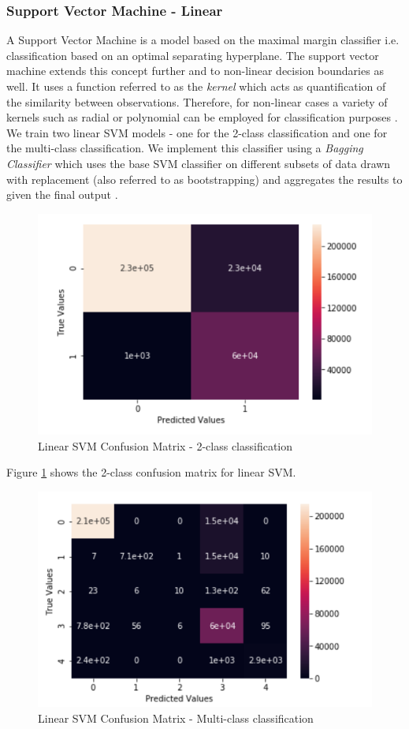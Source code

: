 \subsubsection{Support Vector Machine - Linear}
A Support Vector Machine is a model based on the maximal margin classifier i.e. classification based on an optimal separating hyperplane. The support vector machine extends this concept further and to non-linear decision boundaries as well. It uses a function referred to as the {\em kernel} which acts as quantification of the similarity between observations. Therefore, for non-linear cases a variety of kernels such as radial or polynomial can be employed for classification purposes \cite{islr09}.\\
We train two linear SVM models - one for the 2-class classification and one for the multi-class classification. We implement this classifier using a {\em Bagging Classifier} which uses the base SVM classifier on different subsets of data drawn with replacement (also referred to as bootstrapping) and aggregates the results to given the final output \cite{scikit12}. 
\begin{figure}
	\includegraphics[width=1.0\columnwidth]{images/svm2.PNG}
	\caption{Linear SVM Confusion Matrix - 2-class classification}
	\label{F:linsvm2}
\end{figure}
Figure \ref{F:linsvm2} shows the 2-class confusion matrix for linear SVM.
\begin{figure}
	\includegraphics[width=1.0\columnwidth]{images/svmall.PNG}
	\caption{Linear SVM Confusion Matrix - Multi-class classification}
	\label{F:linsvmall}
\end{figure}
